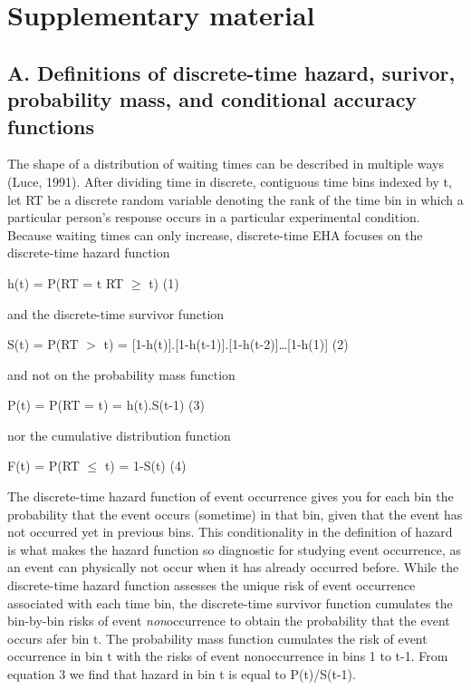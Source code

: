 \documentclass[
  man, donotrepeattitle,floatsintext]{apa6}
\begin{document}
\newpage

\section{Supplementary material}\label{supplementary-material}

\subsection{A. Definitions of discrete-time hazard, surivor, probability mass, and conditional accuracy functions}\label{a.-definitions-of-discrete-time-hazard-surivor-probability-mass-and-conditional-accuracy-functions}

The shape of a distribution of waiting times can be described in multiple ways (Luce, 1991). After dividing time in discrete, contiguous time bins indexed by t, let RT be a discrete random variable denoting the rank of the time bin in which a particular person's response occurs in a particular experimental condition.
Because waiting times can only increase, discrete-time EHA focuses on the discrete-time hazard function

\noindent h(t) = P(RT = t\textbar{} RT \(\geq\) t) \hfill  (1)

\noindent and the discrete-time survivor function

\noindent S(t) = P(RT \(>\) t) = {[}1-h(t){]}.{[}1-h(t-1){]}.{[}1-h(t-2){]}\ldots{[}1-h(1){]} \hfill  (2)

\noindent and not on the probability mass function

\noindent P(t) = P(RT = t) = h(t).S(t-1) \hfill  (3)

\noindent nor the cumulative distribution function

\noindent F(t) = P(RT \(\leq\) t) = 1-S(t) \hfill  (4)

The discrete-time hazard function of event occurrence gives you for each bin the probability that the event occurs (sometime) in that bin, given that the event has not occurred yet in previous bins. This conditionality in the definition of hazard is what makes the hazard function so diagnostic for studying event occurrence, as an event can physically not occur when it has already occurred before. While the discrete-time hazard function assesses the unique risk of event occurrence associated with each time bin, the discrete-time survivor function cumulates the bin-by-bin risks of event \emph{non}occurrence to obtain the probability that the event occurs afer bin t. The probability mass function cumulates the risk of event occurrence in bin t with the risks of event nonoccurrence in bins 1 to t-1. From equation 3 we find that hazard in bin t is equal to P(t)/S(t-1).
\end{document}
